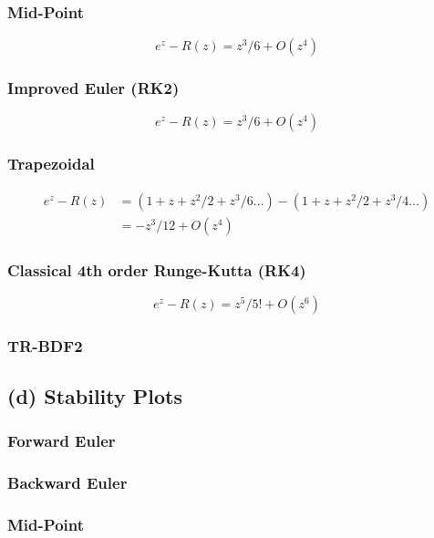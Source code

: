 \documentclass{article}
\begin{document}
\subsubsection*{Mid-Point}
\begin{equation}
e^z-R(z)=z^3/6+O(z^4)
\end{equation}

\subsubsection*{Improved Euler (RK2)}
\begin{equation}
e^z-R(z)=z^3/6+O(z^4)
\end{equation}

\subsubsection*{Trapezoidal}
\begin{align}
e^z-R(z)&=(1+z+z^2/2+z^3/6\dots)-(1+z+z^2/2+z^3/4\dots) \nonumber\\
&=-z^3/12+O(z^4)
\end{align}

\subsubsection*{Classical 4th order Runge-Kutta (RK4)}
\begin{equation}
e^z-R(z)=z^5/5!+O(z^6)
\end{equation}

\subsubsection*{TR-BDF2}

\subsection*{(d) Stability Plots}
\subsubsection*{Forward Euler}

\subsubsection*{Backward Euler}

\subsubsection*{Mid-Point}
\end{document}
